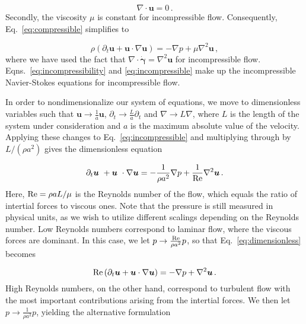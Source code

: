 \documentclass[final,3p,twocolumn]{elsarticle}
\begin{document}
\begin{equation}
    \nabla \cdot \bm{u} = 0 \,.
    \label{eq:incompressibility}
\end{equation}
%
Secondly, the viscosity $\mu$ is constant for incompressible flow.
Consequently, Eq.\ \eqref{eq:compressible} simplifies to 

\begin{equation}
    \rho \left( \partial_t \bm{u} + \bm{u} \cdot \nabla \bm{u} \right) 
    = - \nabla p + \mu \nabla^2 \bm{u} \,,
    \label{eq:incompressible}
\end{equation}
%
where we have used the fact that $\nabla \cdot \dot{\bm{\gamma}} = \nabla^2
\bm{u}$ for incompressible flow. Eqns.\ \eqref{eq:incompressibility} and
\eqref{eq:incompressible} make up the incompressible Navier-Stokes equations
for incompressible flow. 

In order to nondimensionalize our system of equations, we move to dimensionless
variables such that $\bm{u} \rightarrow \frac{1}{a} \bm{u}$, $\partial_t \rightarrow
\frac{L}{a} \partial_t$ and $\nabla \rightarrow L \nabla$, where $L$ is
the length of the system under consideration and $a$ is the maximum absolute
value of the velocity. Applying these changes to Eq.\ \eqref{eq:incompressible}
and multiplying through by $L/(\rho a^2)$ gives the dimensionless equation 

\begin{equation}
    \partial_t \bm{u} + \bm{u} \cdot \nabla \bm{u} = - \frac{1}{\rho a^2}
    \nabla p + \frac{1}{\rm Re} \nabla^2 \bm{u} \,.
    \label{eq:dimensionless}
\end{equation}
%
Here, ${\rm Re} = \rho a L / \mu$ is the Reynolds number of the flow, which
equals the ratio of intertial forces to viscous ones. Note that the pressure
is still measured in physical units, as we wish to utilize different scalings
depending on the Reynolds number. Low Reynolds numbers correspond to laminar
flow, where the viscous forces are dominant. In this case, we let $p
\rightarrow \frac{\rm Re}{\rho a^2} p$, so that Eq.\ \eqref{eq:dimensionless}
becomes

\begin{equation}
    {\rm Re} \left( \partial_t \bm{u} + \bm{u} \cdot \nabla \bm{u} \right)  = -
    \nabla p + \nabla^2 \bm {u} \,.
    \label{eq:loRe}
\end{equation}
%
High Reynolds numbers, on the other hand, correspond to turbulent flow with the
most important contributions arising from the intertial forces. We then let $p
\rightarrow \frac{1}{\rho a^2} p$, yielding the alternative formulation 
\end{document}
